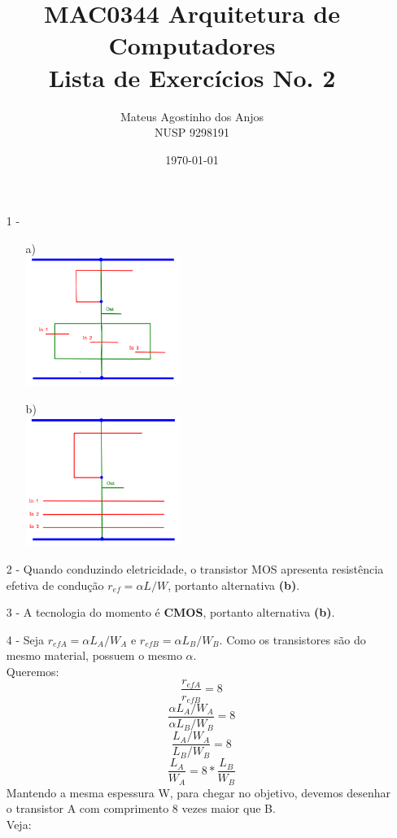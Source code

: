 \documentclass[12pt]{article}
\title{MAC0344 Arquitetura de Computadores\\
Lista de Exercícios No. 2
}
\author{Mateus Agostinho dos Anjos\\NUSP 9298191}
\date{\today}
\begin{document}
	\maketitle
	\begin{itemize}
		\item[1 -]
			\hfill\\
			\begin{itemize}
				\item[a)]
					\hfill \\
					\includegraphics[width=5cm]{porta_NOR_3_entradas.png}
				\item[b)]
					\hfill \\
					\includegraphics[width=5cm]{porta_NAND_3_entradas.png}
			\end{itemize}
		\item[2 -]
			Quando conduzindo eletricidade, o transistor MOS apresenta
			resistência efetiva de condução $r_{ef} = \alpha L/W$,
			portanto alternativa \textbf{(b)}.
		\item[3 -]
			A tecnologia do momento é \textbf{CMOS}, portanto
			alternativa \textbf{(b)}.
		\item[4 -]
			Seja $r_{efA} = \alpha L_A/W_A$ e $r_{efB} = \alpha L_B/W_B$.
			Como os transistores são do mesmo material, possuem o mesmo
			$\alpha$.\\
			Queremos:
			$$\frac{r_{efA}}{r_{efB}} = 8$$
			$$\frac{\alpha L_A/W_A}{\alpha L_B/W_B} = 8$$
			$$\frac{L_A/W_A}{L_B/W_B} = 8$$
			$$\frac{L_A}{W_A} = 8 * \frac{L_B}{W_B}$$
			Mantendo a mesma espessura W, para chegar no objetivo, devemos
			desenhar o transistor A com comprimento 8 vezes maior que
			B.\\
			Veja:
	\end{itemize}
\end{document}
